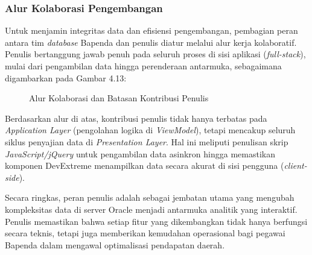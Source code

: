 \subsubsection{Alur Kolaborasi Pengembangan}

Untuk menjamin integritas data dan efisiensi pengembangan, pembagian peran antara tim \emph{database} Bapenda dan penulis diatur melalui alur kerja kolaboratif. Penulis bertanggung jawab penuh pada seluruh proses di sisi aplikasi (\emph{full-stack}), mulai dari pengambilan data hingga perenderaan antarmuka, sebagaimana digambarkan pada Gambar 4.13:

\begin{figure}[H]
    \centering
    \caption{Alur Kolaborasi dan Batasan Kontribusi Penulis}
    \label{fig:alur_kolaborasi}
\end{figure}

Berdasarkan alur di atas, kontribusi penulis tidak hanya terbatas pada \emph{Application Layer} (pengolahan logika di \emph{ViewModel}), tetapi mencakup seluruh siklus penyajian data di \emph{Presentation Layer}. Hal ini meliputi penulisan skrip \emph{JavaScript/jQuery} untuk pengambilan data asinkron hingga memastikan komponen DevExtreme menampilkan data secara akurat di sisi pengguna (\emph{client-side}).

Secara ringkas, peran penulis adalah sebagai jembatan utama yang mengubah kompleksitas data di server Oracle menjadi antarmuka analitik yang interaktif. Penulis memastikan bahwa setiap fitur yang dikembangkan tidak hanya berfungsi secara teknis, tetapi juga memberikan kemudahan operasional bagi pegawai Bapenda dalam mengawal optimalisasi pendapatan daerah.